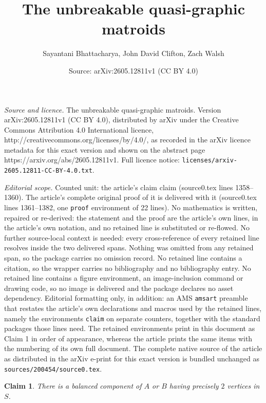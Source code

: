 \documentclass[10pt,a4paper]{amsart}
\title{The unbreakable quasi-graphic matroids}
\author{Sayantani Bhattacharya, John David Clifton, Zach Walsh}
\date{Source: arXiv:2605.12811v1 (CC BY 4.0)}
\newtheorem{claim}{Claim}
\begin{document}
\maketitle

\noindent\emph{Source and licence.} The unbreakable quasi-graphic matroids. Version arXiv:2605.12811v1 (CC BY 4.0), distributed by arXiv under the Creative Commons Attribution 4.0 International licence, http://creativecommons.org/licenses/by/4.0/, as recorded in the arXiv licence metadata for this exact version and shown on the abstract page https://arxiv.org/abs/2605.12811v1. Full licence notice: \texttt{licenses/arxiv-2605.12811-CC-BY-4.0.txt}.\par\smallskip

\noindent\textit{Editorial scope.} Counted unit: the article's claim claim (source0.tex lines 1358--1360). The article's complete original proof of it is delivered with it (source0.tex lines 1361--1382, one \texttt{proof} environment of 22 lines). No mathematics is written, repaired or re-derived: the statement and the proof are the article's own lines, in the article's own notation, and no retained line is substituted or re-flowed.  No further source-local context is needed: every cross-reference of every retained line resolves inside the two delivered spans.  Nothing was omitted from any retained span, so the package carries no omission record.  No retained line contains a citation, so the wrapper carries no bibliography and no bibliography entry.  No retained line contains a figure environment, an image-inclusion command or drawing code, so no image is delivered and the package declares no asset dependency.  Editorial formatting only, in addition: an AMS \texttt{amsart} preamble that restates the article's own declarations and macros used by the retained lines, namely the environments \texttt{claim} on separate counters, together with the standard packages those lines need.  The retained environments print in this document as Claim 1 in order of appearance, whereas the article prints the same items with the numbering of its own full document.  The complete native source of the article as distributed in the arXiv e-print for this exact version is bundled unchanged as \texttt{sources/200454/source0.tex}.
\begin{claim}
    There is a balanced component of $A$ or $B$ having precisely $2$ vertices in $S$.
\end{claim} 
\end{document}
